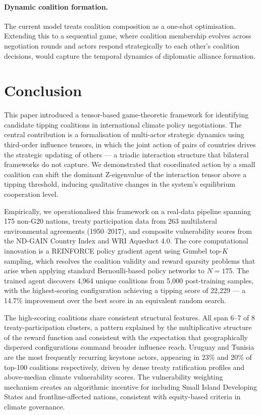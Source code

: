 \documentclass[11pt]{article}
\begin{document}
\paragraph{Dynamic coalition formation.}
The current model treats coalition composition as a one-shot optimisation. Extending this to a sequential game, where coalition membership evolves across negotiation rounds and actors respond strategically to each other's coalition decisions, would capture the temporal dynamics of diplomatic alliance formation.


\section{Conclusion}
\label{sec:conclusion}

This paper introduced a tensor-based game-theoretic framework for identifying candidate tipping coalitions in international climate policy negotiations. The central contribution is a formalisation of multi-actor strategic dynamics using third-order influence tensors, in which the joint action of pairs of countries drives the strategic updating of others --- a triadic interaction structure that bilateral frameworks do not capture. We demonstrated that coordinated action by a small coalition can shift the dominant Z-eigenvalue of the interaction tensor above a tipping threshold, inducing qualitative changes in the system's equilibrium cooperation level.

Empirically, we operationalised this framework on a real-data pipeline spanning 175 non-G20 nations, treaty participation data from 263 multilateral environmental agreements (1950--2017), and composite vulnerability scores from the ND-GAIN Country Index and WRI Aqueduct 4.0. The core computational innovation is a REINFORCE policy gradient agent using Gumbel top-$K$ sampling, which resolves the coalition validity and reward sparsity problems that arise when applying standard Bernoulli-based policy networks to $N = 175$. The trained agent discovers 4{,}964 unique coalitions from 5{,}000 post-training samples, with the highest-scoring configuration achieving a tipping score of 22{,}229 --- a 14.7\% improvement over the best score in an equivalent random search.

The high-scoring coalitions share consistent structural features. All span 6--7 of 8 treaty-participation clusters, a pattern explained by the multiplicative structure of the reward function and consistent with the expectation that geographically dispersed configurations command broader influence reach. Uruguay and Tunisia are the most frequently recurring keystone actors, appearing in 23\% and 20\% of top-100 coalitions respectively, driven by dense treaty ratification profiles and above-median climate vulnerability scores. The vulnerability weighting mechanism creates an algorithmic incentive for including Small Island Developing States and frontline-affected nations, consistent with equity-based criteria in climate governance.
\end{document}
